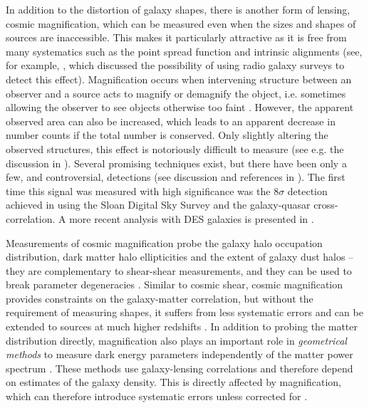 \documentclass[useAMS,usenatbib]{mnras}
\begin{document}
In addition to the distortion of galaxy shapes, there is another form of lensing, cosmic magnification, which can be measured even when the sizes and shapes of sources are inaccessible. This makes it particularly attractive as it is free from many systematics such as the point spread function and intrinsic alignments (see, for example, \citet{2006MNRAS.367..169Z}, which discussed the possibility of using radio galaxy surveys to detect this effect). Magnification  occurs when intervening structure between an observer and a source acts to magnify or demagnify the object, i.e. sometimes allowing the observer to see objects otherwise too faint \citep{Bartelmann:1999yn}. However, the apparent observed area can also be increased, which leads to an apparent decrease in number counts if the total number is conserved. Only slightly altering the observed structures, this effect is notoriously difficult to measure (see e.g. the discussion in \citet{2009A&A...507..683H}). Several promising techniques exist, but there have been only a few, and controversial, detections (see discussion and references in \cite{2005ApJ...633..589S}). The first time this signal was measured with high significance was the $8\sigma$ detection achieved in \citet{2005ApJ...633..589S} using the Sloan Digital Sky Survey and the galaxy-quasar cross-correlation. A more recent analysis with DES galaxies is presented in \citet{Garcia-Fernandez:2016oud}.

Measurements of cosmic magnification probe the galaxy halo occupation distribution, dark matter halo ellipticities and the extent of galaxy dust halos \citep{2005ApJ...633..589S,Menard:2009yb} -- they are complementary to shear-shear measurements, and they can be used to break parameter degeneracies \citep{VanWaerbeke:2010yp}.
Similar to cosmic shear, cosmic magnification provides constraints on the galaxy-matter correlation, but without the requirement of measuring shapes, it suffers from less systematic errors and can be extended to sources at much higher redshifts \citep{2005ApJ...633..589S}. In addition to probing the matter distribution directly, magnification also plays an important role in \emph{geometrical methods} to measure dark energy parameters independently of the matter power spectrum \citep{2003PhRvL..91n1302J,2004ApJ...600...17B,2007MNRAS.374.1377T}. These methods use galaxy-lensing correlations and therefore depend on estimates of the galaxy density. This is directly affected by magnification, which can therefore introduce systematic errors unless corrected for \citep{2005ApJ...633..589S,2007PhRvD..76j3502H,2008PhRvD..78l3517Z,Bonvin:2011bg}.
\end{document}

